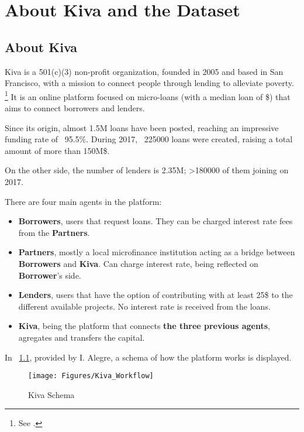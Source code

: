 \chapter{About Kiva and the Dataset} %


\label{Chapter1} %



\section{About Kiva}
Kiva is a 501(c)(3) non-profit organization, founded in 2005 and based in San Francisco, with a mission to connect people through lending to alleviate poverty. \footnote{See \textcite{Kiva}.}
It is an online platform focused on micro-loans (with a median loan of \$) that aims to connect borrowers and lenders. \par
Since its origin, almost 1.5M loans have been posted, reaching an impressive funding rate of ~95.5\%. During 2017, ~225000 loans were created, raising a total amount of more than 150M\$. \par
On the other side, the number of lenders is 2.35M; >180000 of them joining on 2017. \par
There are four main agents in the platform:
\begin{itemize}
\item \textbf{Borrowers}, users that request loans. They can be charged interest rate fees from the \textbf{Partners}.
\item \textbf{Partners}, mostly a local microfinance institution acting as a bridge between \textbf{Borrowers} and \textbf{Kiva}. Can charge interest rate, being reflected on \textbf{Borrower}'s side.
\item \textbf{Lenders}, users that have the option of contributing with at least 25\$ to the different available projects. No interest rate is received from the loans.
\item \textbf{Kiva}, being the platform that connects \textbf{the three previous agents}, agregates and transfers the capital.
\end{itemize}
In ~\ref{fig:DiagramJourney}, provided by I. Alegre, a schema of how the platform works is displayed.
\begin{figure}[H]
\centering
\texttt{[image: Figures/Kiva\_Workflow]}
\caption[Kiva Schema]{Kiva Schema}
\label{fig:DiagramJourney}
\end{figure}


